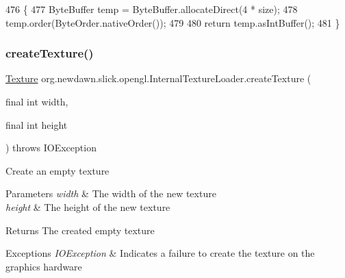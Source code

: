 \begin{DoxyCode}
476                                                       \{
477       ByteBuffer temp = ByteBuffer.allocateDirect(4 * size);
478       temp.order(ByteOrder.nativeOrder());
479 
480       \textcolor{keywordflow}{return} temp.asIntBuffer();
481     \}    
\end{DoxyCode}
\mbox{\label{classorg_1_1newdawn_1_1slick_1_1opengl_1_1_internal_texture_loader_a153ef66a72ef567377e97b6e9604f7a1}} 
\subsubsection{\texorpdfstring{create\+Texture()}{createTexture()}\hspace{0.1cm}{\footnotesize\ttfamily [1/2]}}
{\footnotesize\ttfamily \mbox{\hyperlink{interfaceorg_1_1newdawn_1_1slick_1_1opengl_1_1_texture}{Texture}} org.\+newdawn.\+slick.\+opengl.\+Internal\+Texture\+Loader.\+create\+Texture (\begin{DoxyParamCaption}\item[{final int}]{width,  }\item[{final int}]{height }\end{DoxyParamCaption}) throws I\+O\+Exception\hspace{0.3cm}{\ttfamily [inline]}}

Create an empty texture


\begin{DoxyParams}{Parameters}
{\em width} & The width of the new texture \\
\hline
{\em height} & The height of the new texture \\
\hline
\end{DoxyParams}
\begin{DoxyReturn}{Returns}
The created empty texture 
\end{DoxyReturn}

\begin{DoxyExceptions}{Exceptions}
{\em I\+O\+Exception} & Indicates a failure to create the texture on the graphics hardware \\
\hline
\end{DoxyExceptions}


